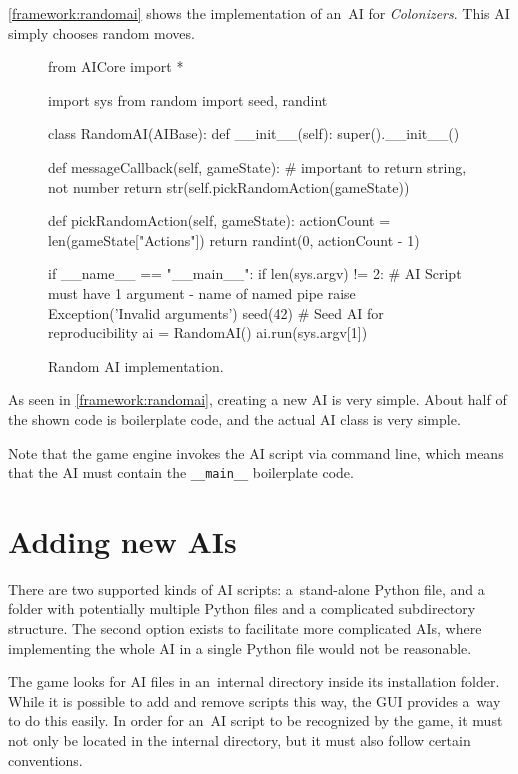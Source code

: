 \clearpage
\autoref{framework:randomai} shows the implementation of an~AI for \emph{Colonizers}.
This AI simply chooses random moves.

\begin{figure}[h!]
\begin{code}[commandchars=\\\{\},codes={\catcode`\$=3\catcode`\^=7\catcode`\_=8}]
from AICore import *

import sys
from random import seed, randint

class RandomAI(AIBase):
    def \_\_init\_\_(self):
        super().\_\_init\_\_()

    def messageCallback(self, gameState):
        # important to return string, not number
        return str(self.pickRandomAction(gameState))

    def pickRandomAction(self, gameState):
        actionCount = len(gameState["Actions"])
        return randint(0, actionCount - 1)

if \_\_name\_\_ == "\_\_main\_\_":
    if len(sys.argv) != 2:
        # AI Script must have 1 argument - name of named pipe
        raise Exception('Invalid arguments')
    seed(42) # Seed AI for reproducibility
    ai = RandomAI()
    ai.run(sys.argv[1])
\end{code}
\caption{Random AI implementation.}\label{framework:randomai}
\end{figure}

As seen in \autoref{framework:randomai}, creating a new AI is very simple.
About half of the shown code is boilerplate code, and the actual AI
class is very simple.

Note that the game engine invokes the AI script via command line, which
means that the AI must contain the \texttt{\_\_main\_\_} boilerplate code.

\section{Adding new AIs}

There are two supported kinds of AI scripts: a~stand-alone Python file,
and a folder with potentially multiple Python files and a complicated subdirectory
structure. The second option exists to facilitate more complicated AIs, where
implementing the whole AI in a single Python file would not be reasonable.

The game looks for AI files in an~internal directory inside its installation folder.
While it is possible to add and remove scripts this way, the GUI provides a~way
to do this easily. In order for an~AI script to be recognized by the game, it must not
only be located in the internal directory, but it must also follow certain conventions.

